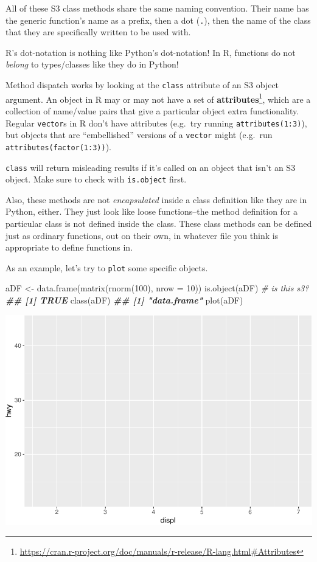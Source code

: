 \documentclass[
  12pt,
]{krantz}
\makeatletter
\newenvironment{Shaded}{\begin{snugshade}}{\end{snugshade}}
\newcommand{\AttributeTok}[1]{\textcolor[rgb]{0.61,0.61,0.61}{#1}}
\newcommand{\CommentTok}[1]{\textcolor[rgb]{0.37,0.37,0.37}{\textit{#1}}}
\newcommand{\DecValTok}[1]{\textcolor[rgb]{0.06,0.06,0.06}{#1}}
\newcommand{\DocumentationTok}[1]{\textcolor[rgb]{0.37,0.37,0.37}{\textbf{\textit{#1}}}}
\newcommand{\FunctionTok}[1]{\textcolor[rgb]{0,0,0}{#1}}
\newcommand{\NormalTok}[1]{#1}
\newcommand{\OtherTok}[1]{\textcolor[rgb]{0.37,0.37,0.37}{#1}}
\renewcommand{\href}[2]{#2\footnote{\url{#1}}}
\newenvironment{kframe}{%
\medskip{}
\setlength{\fboxsep}{.8em}
 \def\at@end@of@kframe{}%
 \ifinner\ifhmode%
  \def\at@end@of@kframe{\end{minipage}}%
  \begin{minipage}{\columnwidth}%
 \fi\fi%
 \def\FrameCommand##1{\hskip\@totalleftmargin \hskip-\fboxsep
 \colorbox{shadecolor}{##1}\hskip-\fboxsep
     \hskip-\linewidth \hskip-\@totalleftmargin \hskip\columnwidth}%
 \MakeFramed {\advance\hsize-\width
   \@totalleftmargin\z@ \linewidth\hsize
   \@setminipage}}%
 {\par\unskip\endMakeFramed%
 \at@end@of@kframe}
\renewenvironment{Shaded}{\begin{kframe}}{\end{kframe}}
\makeatother
\begin{document}
All of these S3 class methods share the same naming convention. Their name has the generic function's name as a prefix, then a dot (\texttt{.}), then the name of the class that they are specifically written to be used with.

R's dot-notation is nothing like Python's dot-notation! In R, functions do not \emph{belong} to types/classes like they do in Python!

Method dispatch works by looking at the \texttt{class} attribute of an S3 object argument. An object in R may or may not have a set of \href{https://cran.r-project.org/doc/manuals/r-release/R-lang.html\#Attributes}{\textbf{attributes}}, which are a collection of name/value pairs that give a particular object extra functionality. Regular \texttt{vector}s in R don't have attributes (e.g.~try running \texttt{attributes(1:3)}), but objects that are ``embellished'' versions of a \texttt{vector} might (e.g.~run \texttt{attributes(factor(1:3))}).

\texttt{class} will return misleading results if it's called on an object that isn't an S3 object. Make sure to check with \texttt{is.object} first.

Also, these methods are not \emph{encapsulated} inside a class definition like they are in Python, either. They just look like loose functions--the method definition for a particular class is not defined inside the class. These class methods can be defined just as ordinary functions, out on their own, in whatever file you think is appropriate to define functions in.

As an example, let's try to \texttt{plot} some specific objects.

\begin{Shaded}
\begin{Highlighting}[]
\NormalTok{aDF }\OtherTok{\textless{}{-}} \FunctionTok{data.frame}\NormalTok{(}\FunctionTok{matrix}\NormalTok{(}\FunctionTok{rnorm}\NormalTok{(}\DecValTok{100}\NormalTok{), }\AttributeTok{nrow =} \DecValTok{10}\NormalTok{))}
\FunctionTok{is.object}\NormalTok{(aDF) }\CommentTok{\# is this s3?}
\DocumentationTok{\#\# [1] TRUE}
\FunctionTok{class}\NormalTok{(aDF)}
\DocumentationTok{\#\# [1] "data.frame"}
\FunctionTok{plot}\NormalTok{(aDF)}
\end{Highlighting}
\end{Shaded}

\includegraphics[width=0.5\linewidth]{r_and_python_book_files/figure-latex/unnamed-chunk-192-1}
\end{document}
